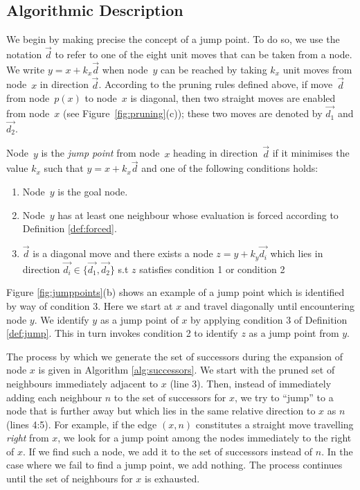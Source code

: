 \subsection{Algorithmic Description}
We begin by making precise the concept of a jump point.  
To do so, we use the notation $\vec{d}$ 
to refer to one of the eight unit moves that can be taken from a node.  
We write $y = x + k_{x}\vec{d}$ when node~$y$ can be reached 
by taking $k_{x}$ unit moves from node~$x$ in direction $\vec{d}$.
According to the pruning rules defined above, 
if move~$\vec{d}$ from node~$p(x)$ to node~$x$ is diagonal, 
then two straight moves are enabled from node~$x$ 
(see Figure~\ref{fig:pruning}(c)); 
these two moves are denoted by $\vec{d_1}$ and $\vec{d_2}$.  

\begin{definition}
\label{def:jump}
Node~$y$ is the \emph{jump point} from node~$x$ heading in direction~$\vec{d}$ 
if it minimises the value $k_x$ such that $y = x + k_{x} \vec{d}$ and one of the following conditions holds: 
\begin{enumerate}
\item{Node~$y$ is the goal node.}
\item{Node~$y$ has at least one neighbour whose evaluation is forced according 
to Definition \ref{def:forced}.}
\item{$\vec{d}$ is a diagonal move and there exists 
a node $z = y + k_{y} \vec{d_{i}}$ which lies in direction $\vec{d_i} \in \{\vec{d_1},\vec{d_2}\}$ s.t
$z$ satisfies condition 1 or condition 2 }
\end{enumerate}
\end{definition}

Figure \ref{fig:jumppoints}(b) shows an example of a jump point which is
identified by way of condition 3.
Here we start at $x$ and travel diagonally until encountering node $y$. 
We identify $y$ as a jump point of $x$ by applying condition 3 of 
Definition \ref{def:jump}. This in turn invokes condition 2 to identify $z$ 
as a jump point from $y$.



The process by which we generate the set of successors during the expansion of 
node $x$ is given in Algorithm \ref{alg:successors}.
We start with the pruned set of neighbours immediately adjacent to $x$ (line 3).
Then, instead of immediately adding each neighbour $n$ to the set of successors
for $x$, we try to ``jump'' to a node that is further away but which lies in the 
same relative direction to $x$ as $n$ (lines 4:5). 
For example, if the edge $(x, n)$ constitutes a
straight move travelling \emph{right} from $x$, we look for a jump point among
the nodes immediately to the right of $x$.
If we find such a node, we add it to the set of successors instead of $n$.
In the case where we fail to find a jump point, we add nothing.
The process continues until the set of neighbours for $x$ is exhausted.

